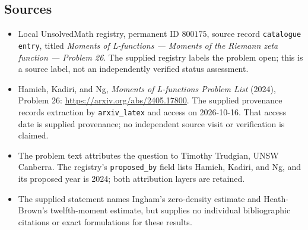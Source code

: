 \documentclass[11pt]{article}
\begin{document}
\subsection{Sources}
\begin{itemize}
\item Local UnsolvedMath registry, permanent ID \(800175\), source record \texttt{catalogue entry}, titled \emph{Moments of L-functions --- Moments of the Riemann zeta function --- Problem 26}. The supplied registry labels the problem open; this is a source label, not an independently verified status assessment.
\item Hamieh, Kadiri, and Ng, \emph{Moments of L-functions Problem List} (2024), Problem 26: \url{https://arxiv.org/abs/2405.17800}. The supplied provenance records extraction by \texttt{arxiv\_latex} and access on 2026-10-16. That access date is supplied provenance; no independent source visit or verification is claimed.
\item The problem text attributes the question to Timothy Trudgian, UNSW Canberra. The registry's \texttt{proposed\_by} field lists Hamieh, Kadiri, and Ng, and its proposed year is 2024; both attribution layers are retained.
\item The supplied statement names Ingham's zero-density estimate and Heath-Brown's twelfth-moment estimate, but supplies no individual bibliographic citations or exact formulations for these results.
\end{itemize}
\end{document}
